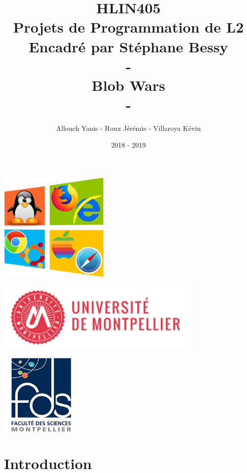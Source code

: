 \documentclass[11pt,a4paper]{article}
\author{Allouch Yanis - Roux Jérémie - Villaroya Kévin}
\title{HLIN405 \\ Projets de Programmation de L2 \\ Encadré par Stéphane Bessy\\ - \\ \textbf{Blob Wars} \\ - \\ }
\date{2018 - 2019}
\begin{document}
\maketitle

\vspace{8px}

\begin{center}
\includegraphics[width=0.4\textwidth]{figures/icone.png}
\end{center}

\vspace{10px}

\begin{center}
\includegraphics[width = 100mm]{figures/umontpellier}
\end{center}

\vspace{10px}

\begin{center}
\includegraphics[width = 40mm]{figures/facSciences}
\end{center}

\newpage
{\small\tableofcontents}

\newpage

\part{Introduction}
\end{document}

